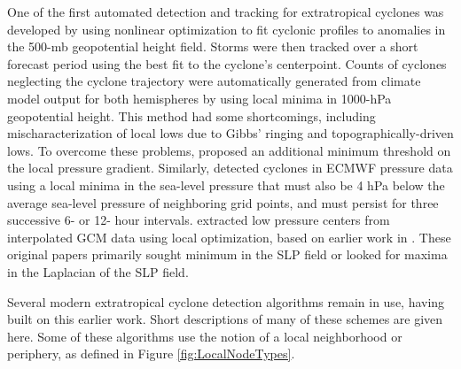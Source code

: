 \documentclass[gmdd, hvmath, online]{copernicus_discussions}
\begin{document}
One of the first automated detection and tracking for extratropical cyclones was developed by \cite{williamson1981storm} using nonlinear optimization to fit cyclonic profiles to anomalies in the 500-mb geopotential height field.  Storms were then tracked over a short forecast period using the best fit to the cyclone's centerpoint.  Counts of cyclones neglecting the cyclone trajectory were automatically generated from climate model output for both hemispheres by \cite{lambert1988cyclone} using local minima in 1000-hPa geopotential height.  This method had some shortcomings, including mischaracterization of local lows due to Gibbs' ringing and topographically-driven lows.  To overcome these problems, \cite{alpert1990climatological} proposed an additional minimum threshold on the local pressure gradient.  Similarly, \cite{le1990comparison} detected cyclones in ECMWF pressure data using a local minima in the sea-level pressure that must also be 4 hPa below the average sea-level pressure of neighboring grid points, and must persist for three successive 6- or 12- hour intervals.  \cite{murray1991numerical} extracted low pressure centers from interpolated GCM data using local optimization, based on earlier work in \cite{rice1982durivation}.  These original papers primarily sought minimum in the SLP field or looked for maxima in the Laplacian of the SLP field.

Several modern extratropical cyclone detection algorithms remain in use, having built on this earlier work.  Short descriptions of many of these schemes are given here.  Some of these algorithms use the notion of a local neighborhood or periphery, as defined in Figure \ref{fig:LocalNodeTypes}.
\end{document}
